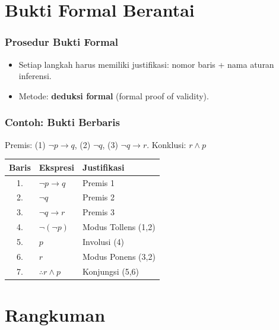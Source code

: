 \documentclass[handout]{beamer}
\theoremstyle{definition}
\theoremstyle{example}
\begin{document}
\section{Bukti Formal Berantai}

\begin{frame}
\frametitle{Prosedur Bukti Formal}
\begin{itemize}
  \item Setiap langkah harus memiliki justifikasi: nomor baris + nama aturan inferensi.
  \item Metode: \textbf{deduksi formal} (formal proof of validity).
\end{itemize}
\end{frame}

\begin{frame}
\frametitle{Contoh: Bukti Berbaris}
Premis: (1) $\neg p \rightarrow q$, (2) $\neg q$, (3) $\neg q \rightarrow r$. Konklusi: $r \wedge p$
\begin{center}
\small
\begin{tabular}{|c|l|l|}
\hline
\textbf{Baris} & \textbf{Ekspresi} & \textbf{Justifikasi} \\
\hline
1. & $\neg p \rightarrow q$ & Premis 1 \\
2. & $\neg q$ & Premis 2 \\
3. & $\neg q \rightarrow r$ & Premis 3 \\
\hline
4. & $\neg(\neg p)$ & Modus Tollens (1,2) \\
5. & $p$ & Involusi (4) \\
6. & $r$ & Modus Ponens (3,2) \\
\hline
7. & $\therefore r \wedge p$ & Konjungsi (5,6) \\
\hline
\end{tabular}
\end{center}
\end{frame}

\section{Rangkuman}
\end{document}
